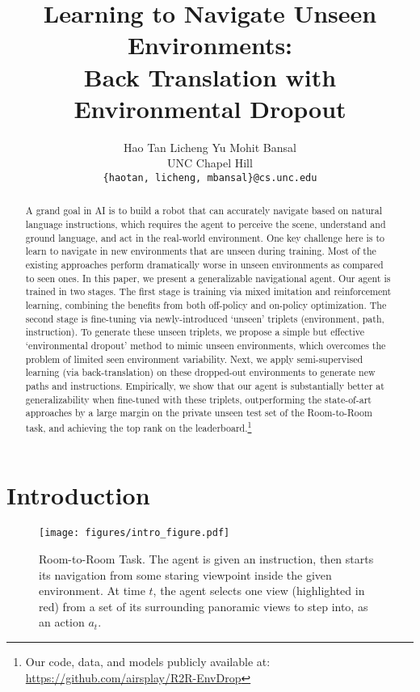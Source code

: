 \documentclass[11pt,a4paper]{article}
\title{
Learning to Navigate Unseen Environments: \\Back Translation with Environmental Dropout
}
\author{Hao Tan \;\;\;\;\;\;\; Licheng Yu \;\;\;\;\;\;\; Mohit Bansal \\
  UNC Chapel Hill \\
  {\tt \{haotan, licheng, mbansal\}@cs.unc.edu} \\
 }
\date{}
\begin{document}
\maketitle




\begin{abstract}
A grand goal in AI is to build a robot that can accurately navigate based on natural language instructions, which requires the agent to perceive the scene, understand and ground language, and act in the real-world environment. One key challenge here is to learn to navigate in new environments that are unseen during training. Most of the existing approaches perform dramatically worse in unseen environments as compared to seen ones.
In this paper, we present a generalizable navigational agent.
Our agent is trained in two stages.
The first stage is training via mixed imitation and reinforcement learning, combining the benefits from both off-policy and on-policy optimization.
The second stage is fine-tuning via newly-introduced `unseen' triplets (environment, path, instruction).
To generate these unseen triplets, we propose a simple but effective `environmental dropout' method to mimic unseen environments, which overcomes the problem of limited seen environment variability.
Next, we apply semi-supervised learning (via back-translation) on these dropped-out environments to generate new paths and instructions.
Empirically, we show that our agent is substantially better at generalizability when fine-tuned with these triplets, outperforming the state-of-art approaches by a large margin on the private unseen test set of the Room-to-Room task, and achieving the top rank on the leaderboard.\footnote{Our code, data, and models publicly available at: \url{https://github.com/airsplay/R2R-EnvDrop}}
\end{abstract}



\section{Introduction}
\begin{figure}[t]
\centering
\texttt{[image: figures/intro\_figure.pdf]}
\vspace{-0.2cm}
\caption{Room-to-Room Task. The agent is given an instruction, then starts its navigation from some staring viewpoint inside the given environment. At time $t$, the agent selects one view (highlighted in red) from a set of its surrounding panoramic views to step into, as an action $a_t$. 
}\label{fig:intro}
\vspace{-0.2cm}
\label{fig:pg}
\end{figure}
\end{document}
